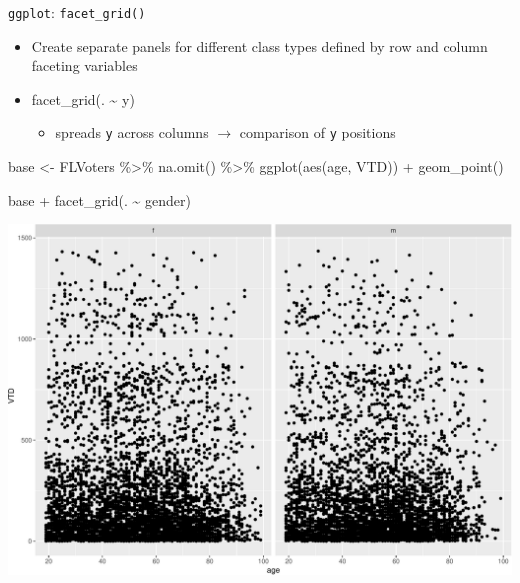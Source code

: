 \documentclass[
  ignorenonframetext,
]{beamer}
\newenvironment{Shaded}{\begin{snugshade}}{\end{snugshade}}
\newcommand{\FunctionTok}[1]{\textcolor[rgb]{0.28,0.35,0.67}{#1}}
\newcommand{\NormalTok}[1]{\textcolor[rgb]{0.00,0.23,0.31}{#1}}
\newcommand{\OtherTok}[1]{\textcolor[rgb]{0.00,0.23,0.31}{#1}}
\newcommand{\SpecialCharTok}[1]{\textcolor[rgb]{0.37,0.37,0.37}{#1}}
\providecommand{\tightlist}{%
  \setlength{\itemsep}{0pt}\setlength{\parskip}{0pt}}\usepackage{longtable,booktabs,array}
\begin{document}
\begin{frame}[fragile]{\texttt{ggplot}: \texttt{facet\_grid()}}
\protect\hypertarget{ggplot-facet_grid}{}
\begin{itemize}
\tightlist
\item
  Create separate panels for different class types defined by row and
  column faceting variables
\item
  facet\_grid(. \textasciitilde{} y)

  \begin{itemize}
  \tightlist
  \item
    spreads \texttt{y} across columns \(\rightarrow\) comparison of
    \texttt{y} positions
  \end{itemize}
\end{itemize}

\begin{Shaded}
\begin{Highlighting}[]
\NormalTok{base }\OtherTok{\textless{}{-}}\NormalTok{ FLVoters }\SpecialCharTok{\%\textgreater{}\%} 
  \FunctionTok{na.omit}\NormalTok{() }\SpecialCharTok{\%\textgreater{}\%} 
  \FunctionTok{ggplot}\NormalTok{(}\FunctionTok{aes}\NormalTok{(age, VTD)) }\SpecialCharTok{+}
  \FunctionTok{geom\_point}\NormalTok{()}

\NormalTok{base }\SpecialCharTok{+}
  \FunctionTok{facet\_grid}\NormalTok{(. }\SpecialCharTok{\textasciitilde{}}\NormalTok{ gender)}
\end{Highlighting}
\end{Shaded}
\end{frame}

\begin{frame}
\includegraphics{uncertainty-tidy-1_files/figure-beamer/unnamed-chunk-15-1.pdf}
\end{frame}
\end{document}
